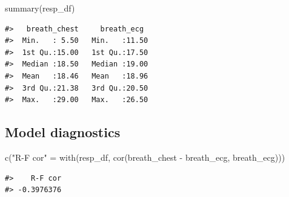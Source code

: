 \documentclass[
]{article}
\newenvironment{Shaded}{\begin{snugshade}}{\end{snugshade}}
\newcommand{\AttributeTok}[1]{\textcolor[rgb]{0.77,0.63,0.00}{#1}}
\newcommand{\ConstantTok}[1]{\textcolor[rgb]{0.00,0.00,0.00}{#1}}
\newcommand{\DecValTok}[1]{\textcolor[rgb]{0.00,0.00,0.81}{#1}}
\newcommand{\FunctionTok}[1]{\textcolor[rgb]{0.00,0.00,0.00}{#1}}
\newcommand{\NormalTok}[1]{#1}
\newcommand{\OtherTok}[1]{\textcolor[rgb]{0.56,0.35,0.01}{#1}}
\newcommand{\SpecialCharTok}[1]{\textcolor[rgb]{0.00,0.00,0.00}{#1}}
\newcommand{\StringTok}[1]{\textcolor[rgb]{0.31,0.60,0.02}{#1}}
\begin{document}
\begin{Shaded}
\begin{Highlighting}[]
\FunctionTok{summary}\NormalTok{(resp\_df)}
\end{Highlighting}
\end{Shaded}

\begin{verbatim}
#>   breath_chest     breath_ecg   
#>  Min.   : 5.50   Min.   :11.50  
#>  1st Qu.:15.00   1st Qu.:17.50  
#>  Median :18.50   Median :19.00  
#>  Mean   :18.46   Mean   :18.96  
#>  3rd Qu.:21.38   3rd Qu.:20.50  
#>  Max.   :29.00   Max.   :26.50
\end{verbatim}

\hypertarget{model-diagnostics-1}{%
\subsection{Model diagnostics}\label{model-diagnostics-1}}

\begin{Shaded}
\begin{Highlighting}[]
\FunctionTok{c}\NormalTok{(}\StringTok{"R{-}F cor"} \OtherTok{=} \FunctionTok{with}\NormalTok{(resp\_df, }\FunctionTok{cor}\NormalTok{(breath\_chest }\SpecialCharTok{{-}}\NormalTok{ breath\_ecg, breath\_ecg)))}
\end{Highlighting}
\end{Shaded}

\begin{verbatim}
#>    R-F cor 
#> -0.3976376
\end{verbatim}

\begin{Shaded}
\end{Shaded}
\end{document}
